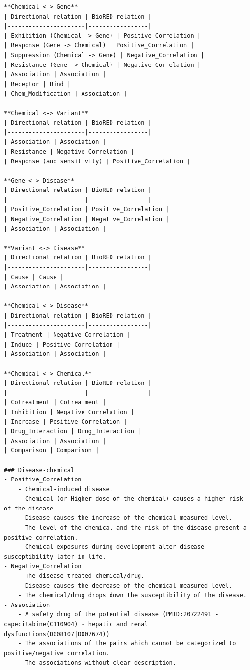 \begin{lstlisting}
**Chemical <-> Gene**
| Directional relation | BioRED relation |
|----------------------|-----------------|
| Exhibition (Chemical -> Gene) | Positive_Correlation |
| Response (Gene -> Chemical) | Positive_Correlation |
| Suppression (Chemical -> Gene) | Negative_Correlation |
| Resistance (Gene -> Chemical) | Negative_Correlation |
| Association | Association |
| Receptor | Bind |
| Chem_Modification | Association |

**Chemical <-> Variant**
| Directional relation | BioRED relation |
|----------------------|-----------------|
| Association | Association |
| Resistance | Negative_Correlation |
| Response (and sensitivity) | Positive_Correlation |

**Gene <-> Disease**
| Directional relation | BioRED relation |
|----------------------|-----------------|
| Positive_Correlation | Positive_Correlation |
| Negative_Correlation | Negative_Correlation |
| Association | Association |

**Variant <-> Disease**
| Directional relation | BioRED relation |
|----------------------|-----------------|
| Cause | Cause |
| Association | Association |

**Chemical <-> Disease**
| Directional relation | BioRED relation |
|----------------------|-----------------|
| Treatment | Negative_Correlation |
| Induce | Positive_Correlation |
| Association | Association |

**Chemical <-> Chemical**
| Directional relation | BioRED relation |
|----------------------|-----------------|
| Cotreatment | Cotreatment |
| Inhibition | Negative_Correlation |
| Increase | Positive_Correlation |
| Drug_Interaction | Drug_Interaction |
| Association | Association |
| Comparison | Comparison |

### Disease-chemical
- Positive_Correlation
    - Chemical-induced disease.
    - Chemical (or Higher dose of the chemical) causes a higher risk of the disease.
    - Disease causes the increase of the chemical measured level.
    - The level of the chemical and the risk of the disease present a positive correlation.
    - Chemical exposures during development alter disease susceptibility later in life.
- Negative_Correlation
    - The disease-treated chemical/drug.
    - Disease causes the decrease of the chemical measured level.
    - The chemical/drug drops down the susceptibility of the disease.
- Association
    - A safety drug of the potential disease (PMID:20722491 - capecitabine(C110904) - hepatic and renal dysfunctions(D008107|D007674))
    - The associations of the pairs which cannot be categorized to positive/negative correlation.
    - The associations without clear description.


\end{lstlisting}
